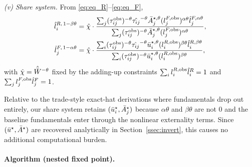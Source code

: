 \emph{(v) Share system.}  From \eqref{eq:eq_R}--\eqref{eq:eq_F},
\begin{align}
  \hat l_i^{R,\,1-\beta\theta}
  &=\hat\chi\cdot
    \frac{\sum_j (\tau_{ij}^{\mathrm{obs}})^{-\theta}\hat{\tau_{ij}}^{-\theta}
             \bar A_j^{\star,\theta}(l_j^{F,\mathrm{obs}})^{\alpha\theta}
             \hat l_j^{F,\alpha\theta}}
         {\sum_j (\tau_{ij}^{\mathrm{obs}})^{-\theta}\bar A_j^{\star,\theta}
             (l_j^{F,\mathrm{obs}})^{\alpha\theta}},
  \label{eq:hat_lR}\\
  \hat l_j^{F,\,1-\alpha\theta}
  &=\hat\chi\cdot
    \frac{\sum_i (\tau_{ij}^{\mathrm{obs}})^{-\theta}\hat{\tau_{ij}}^{-\theta}
             \bar u_i^{\star,\theta}(l_i^{R,\mathrm{obs}})^{\beta\theta}
             \hat l_i^{R,\beta\theta}}
         {\sum_i (\tau_{ij}^{\mathrm{obs}})^{-\theta}\bar u_i^{\star,\theta}
             (l_i^{R,\mathrm{obs}})^{\beta\theta}},
  \label{eq:hat_lF}
\end{align}
with $\hat\chi=\hat{\bar W}^{-\theta}$ fixed by the adding-up
constraints $\sum_i l_i^{R,\mathrm{obs}}\hat l_i^R=1$ and
$\sum_j l_j^{F,\mathrm{obs}}\hat l_j^F=1$.

\begin{remark}
Relative to the trade-style exact-hat derivations where
fundamentals drop out entirely, our share system retains
$(\bar u_i^{\star},\bar A_j^{\star})$ because $\alpha\theta$ and
$\beta\theta$ are not $0$ and the baseline fundamentals enter through
the nonlinear externality terms.  Since $(\bar u^{\star},\bar A^{\star})$
are recovered analytically in Section~\ref{ssec:invert}, this causes
no additional computational burden.
\end{remark}

\paragraph{Algorithm (nested fixed point).}

